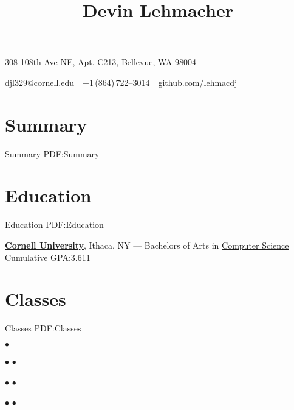 \documentclass[letterpaper,10pt,oneside]{simpleresume}
\makeatletter
\newcommand{\CVAuthor}{Devin Lehmacher}
\newcommand{\CVWebpage}{github.com/lehmacdj}
\newcommand{\CVMailAddress}{djl329@cornell.edu}
\makeatother
\begin{document}
\begin{minipage}[t][0pt]{\linewidth}
\pagestyle{empty}

\title{\CVAuthor}

\begin{subtitle}
\href{https://www.google.com/maps/place/623+University+Ave,+Ithaca,+NY+14850}
{308 108th Ave NE, Apt. C213, Bellevue, WA 98004}
\par
\href{mailto:\CVMailAddress}
{\CVMailAddress}
\,\SubBulletSymbol\,
+1\,(864)\,722--3014
\,\SubBulletSymbol\,
\href{https://\CVWebpage}
{\CVWebpage}
\end{subtitle}

\begin{body}

\section%
{Summary}
{Summary}
{PDF:Summary}

\section%
{Education}
{Education}
{PDF:Education}

\href{https://www.cornell.edu}
{\textbf{Cornell University}}, Ithaca, NY
\hfill
{} ---
\BulletItem%
Bachelors of Arts in
\href{https://www.cs.cornell.edu}{Computer Science}
\BulletItem%
Cumulative GPA:\@ 3.611

\section%
{Classes}
{Classes}
{PDF:Classes}

$\bullet$

$\bullet$
$\bullet$

$\bullet$
$\bullet$

$\bullet$
$\bullet$


\end{body}
\end{minipage}
\end{document}
